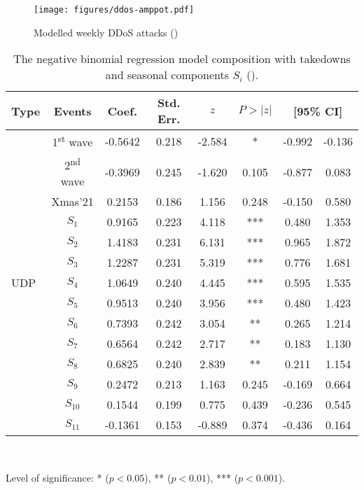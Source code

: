 \documentclass[letterpaper,twocolumn,10pt]{article}
\begin{document}
\begin{figure}[t]
    \centering
    \texttt{[image: figures/ddos-amppot.pdf]}\\
    \caption{Modelled weekly DDoS attacks (\amppot)}
    \label{fig:ddos-amppot}
\end{figure}
\begin{table}[t]
\centering
\vspace{-4mm}
\caption{The negative binomial regression model composition with takedowns and seasonal components $S_i$ (\amppot).}
\setlength{\tabcolsep}{0.225em}
\vspace{2mm}
\small
\begin{tabular}{lccccccc}
    \toprule
    Type & Events & Coef. & Std. Err. & $z$ & $P>|z|$ & \multicolumn{2}{c}{[95\% CI]}\\
    \midrule
    \multirow{15}{*}{UDP} & 1\textsuperscript{st} wave & -0.5642 &  0.218 & -2.584 &  * &  -0.992 &  -0.136\\
    & 2\textsuperscript{nd} wave & -0.3969 &  0.245 & -1.620 &  0.105 &  -0.877 &   0.083\\
    & Xmas'21 & 0.2153 &  0.186 &  1.156 &  0.248 &  -0.150 &   0.580\\
    & $S_{1}$ &   0.9165 &  0.223 &  4.118 &  *** &   0.480 &   1.353\\
    & $S_{2}$ &   1.4183 &  0.231 &  6.131 &  *** &   0.965 &   1.872\\
    & $S_{3}$ &   1.2287 &  0.231 &  5.319 &  *** &   0.776 &   1.681\\
    & $S_{4}$ &   1.0649 &  0.240 &  4.445 &  *** &   0.595 &   1.535\\
    & $S_{5}$ &   0.9513 &  0.240 &  3.956 &  *** &   0.480 &   1.423\\
    & $S_{6}$ &   0.7393 &  0.242 &  3.054 &  ** &   0.265 &   1.214\\
    & $S_{7}$ &   0.6564 &  0.242 &  2.717 &  ** &   0.183 &   1.130\\
    & $S_{8}$ &   0.6825 &  0.240 &  2.839 &  ** &   0.211 &   1.154\\
    & $S_{9}$ &   0.2472 &  0.213 &  1.163 &  0.245 &  -0.169 &   0.664\\
    & $S_{10}$ &  0.1544 &  0.199 &  0.775 &  0.439 &  -0.236 &   0.545\\
    & $S_{11}$ & -0.1361 &  0.153 & -0.889 &  0.374 &  -0.436 &   0.164\\
    \bottomrule
\end{tabular}
\\{\vspace{1mm}\hspace{2mm}\raggedright 
\footnotesize{Level of significance: * ($p < 0.05$), ** ($p < 0.01$), *** ($p < 0.001$).} \par}
\label{tab:nbr-composition-amppot}
\end{table}
\end{document}
